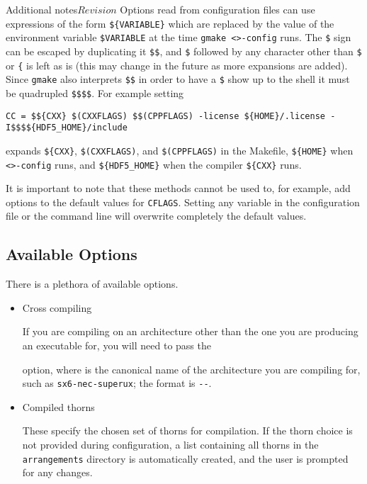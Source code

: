 \begin{cactuspart}{Additional notes}{}{$Revision$}
Options read from configuration files can use expressions of the form
\verb|${VARIABLE}| which are replaced by the value of the environment
variable \verb|$VARIABLE| at the time \texttt{gmake <>-config} runs. The \verb|$| sign can be escaped by duplicating it
\verb|$$|, and \verb|$| followed by any character other than \verb|$| or
\verb|{| is left as is (this may change in the future as more expansions are
added).  Since \texttt{gmake} also interprets \verb|$$| in order to have a
\verb|$| show up to the shell it must be quadrupled \verb|$$$$|. For example
setting
\begin{verbatim}
CC = $${CXX} $(CXXFLAGS) $$(CPPFLAGS) -license ${HOME}/.license -I$$$${HDF5_HOME}/include
\end{verbatim}
expands \verb|${CXX}|, \verb|$(CXXFLAGS)|, and \verb|$(CPPFLAGS)| in the
Makefile, \verb|${HOME}| when \texttt{<>-config} runs,
and \verb|${HDF5_HOME}| when the compiler \verb|${CXX}| runs.

It is important to note that these methods cannot be used to, for example, add
options to the default values for \texttt{CFLAGS}.  Setting any variable in the
configuration file or the command line will overwrite completely the
default values.

\subsection{Available Options}
\label{subsec:Compilation-Available_Options}

There is a plethora of available options.

\begin{itemize}

\item {Cross compiling}

If you are compiling on an architecture other than the one you are
producing an executable for, you will need to pass the

\begin{Lentry}
\item [\texttt{HOST\_MACHINE=\var{x-x-x}}]
\end{Lentry}
option, where \texttt{} is the canonical name of the architecture
you are compiling for, such as \texttt{sx6-nec-superux};  the format is
\texttt{--}.

\item {Compiled thorns}

These specify the chosen set of thorns for compilation. If the thorn choice is not provided
during configuration, a list containing all thorns in the
\texttt{arrangements} directory
is automatically created, and the user is prompted for any changes.


\end{itemize}
\end{cactuspart}
